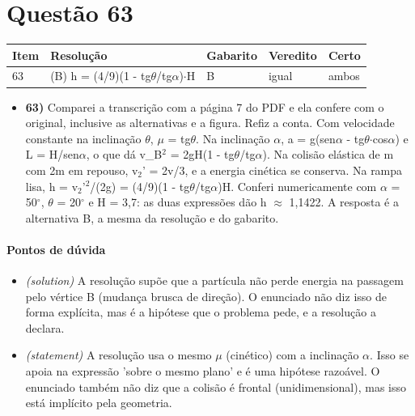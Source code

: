 \documentclass{article}%
\begin{document}
\section*{Questão 63}%
\begin{longtable}{@{}p{} p{} p{} p{} p{}@{}}\toprule Item & Resolução & Gabarito & Veredito & Certo \\ \midrule
63 & (B) h = (4/9)(1 - tg$\theta$/tg$\alpha$)$\cdot$H & B & igual & ambos \\
\bottomrule\end{longtable}%
\begin{itemize}%
\item%
\textbf{63)} Comparei a transcrição com a página 7 do PDF e ela confere com o original, inclusive as alternativas e a figura. Refiz a conta. Com velocidade constante na inclinação $\theta$, $\mu$ = tg$\theta$. Na inclinação $\alpha$, a = g(sen$\alpha$ - tg$\theta$$\cdot$cos$\alpha$) e L = H/sen$\alpha$, o que dá v\_B$^2$ = 2gH(1 - tg$\theta$/tg$\alpha$). Na colisão elástica de m com 2m em repouso, v$_{2}$' = 2v/3, e a energia cinética se conserva. Na rampa lisa, h = v$_{2}$'$^2$/(2g) = (4/9)(1 - tg$\theta$/tg$\alpha$)H. Conferi numericamente com $\alpha$ = 50$^\circ$, $\theta$ = 20$^\circ$ e H = 3,7: as duas expressões dão h $\approx$ 1,1422. A resposta é a alternativa B, a mesma da resolução e do gabarito.%
\end{itemize}%
\paragraph{Pontos de dúvida}%
\begin{itemize}%
\item%
\textit{(solution)} A resolução supõe que a partícula não perde energia na passagem pelo vértice B (mudança brusca de direção). O enunciado não diz isso de forma explícita, mas é a hipótese que o problema pede, e a resolução a declara.%
\item%
\textit{(statement)} A resolução usa o mesmo $\mu$ (cinético) com a inclinação $\alpha$. Isso se apoia na expressão 'sobre o mesmo plano' e é uma hipótese razoável. O enunciado também não diz que a colisão é frontal (unidimensional), mas isso está implícito pela geometria.%
\end{itemize}%
\end{document}
